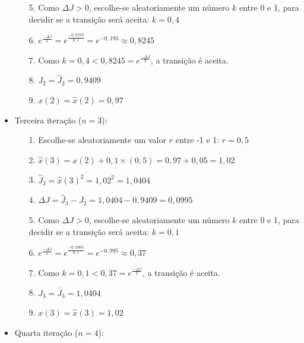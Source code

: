 \documentclass{report}
\begin{document}
\begin{itemize}
\begin{itemize}
\item[5.] Como $\Delta J > 0$, escolhe-se aleatoriamente um número $k$ entre 0 e 1, para decidir se a transição será aceita: $k = 0,4$

\item[6.] $e^{\frac{- \Delta J}{T}} = e^{\frac{- 0,0193}{0,1}} = e^{-0,193} \approx 0,8245$

\item[7.] Como $k = 0,4 < 0,8245 = e^{\frac{- \Delta J}{T}}$, a transição é aceita.

\item[8.] $J_{2} = \hat{J}_{2} = 0,9409$

\item[9.] $x(2) = \hat{x}(2) = 0,97$

\end{itemize}

\item Terceira iteração ($n = 3$):

\begin{itemize}

\item[1.] Escolhe-se aleatoriamente um valor $r$ entre -1 e 1: $r = 0,5$

\item[2.] $\hat{x}(3) = x(2) + 0,1 \times (0,5) = 0,97 + 0,05 = 1,02$

\item[3.] $\hat{J}_{3} = \hat{x}(3)^2 = 1,02^2 = 1,0404$

\item[4.] $\Delta J = \hat{J}_{3} - J_{2} = 1,0404 - 0,9409 = 0,0995$

\item[5.] Como $\Delta J > 0$, escolhe-se aleatoriamente um número $k$ entre 0 e 1, para decidir se a transição será aceita: $k = 0,1$

\item[6.] $e^{\frac{- \Delta J}{T}} = e^{\frac{- 0,0995}{0,1}} = e^{-0,995} \approx 0,37$

\item[7.] Como $k = 0,1 < 0,37 = e^{\frac{- \Delta J}{T}}$, a transição é aceita.

\item[8.] $J_{3} = \hat{J}_{3} = 1,0404$

\item[9.] $x(3) = \hat{x}(3) = 1,02$

\end{itemize}

\item Quarta iteração ($n = 4$):


\end{itemize}
\end{document}
